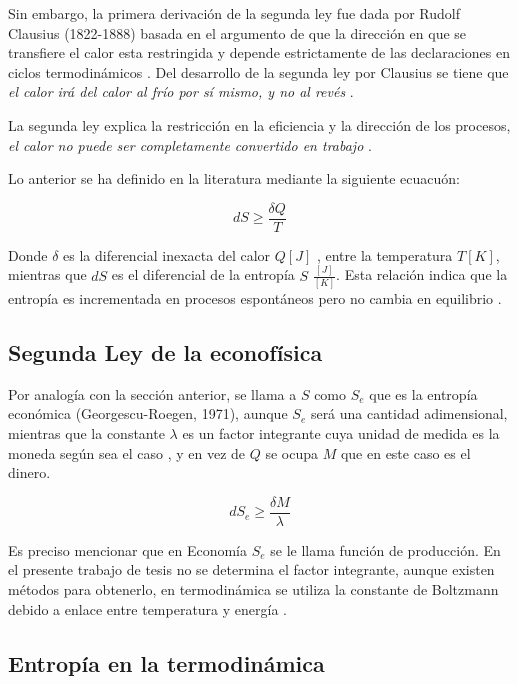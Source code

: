 Sin embargo, la primera derivación de la segunda ley fue dada por Rudolf Clausius (1822-1888) basada en el argumento de que la dirección en que se transfiere el calor esta restringida y depende estrictamente de las declaraciones en ciclos termodinámicos \citep[][pagina 55]{struchtrup}.  Del desarrollo de la segunda ley por Clausius se tiene que \textit{el calor irá del calor al frío por sí mismo, y no al revés} \citep[][pagina 64]{struchtrup}.

La segunda ley explica la restricción en la eficiencia y la dirección de los procesos, \textit{el calor no puede ser completamente convertido en trabajo} \citep[][pagina 5]{struchtrup}. 

Lo anterior se ha definido en la literatura mediante la siguiente ecuacuón:

\begin{equation}
dS \geqslant \frac{\delta Q}{T}
\end{equation}

Donde $\delta$ es la diferencial inexacta del calor $Q [J]$ , entre la temperatura $T [K]$, mientras que $dS$ es el diferencial de la entropía $S$ $\frac{[J]}{[K]}$. Esta relación indica que la entropía es incrementada en procesos espontáneos pero no cambia en equilibrio \citep[][pagina 340]{keszei2011chemical}. 

\subsection{Segunda Ley de la econofísica} 

Por analogía con la sección anterior, se llama a $S$ como $S_e$ que es la entropía económica (Georgescu-Roegen, 1971), aunque $S_e$ será una cantidad adimensional, mientras que la constante $\lambda$ es un factor integrante cuya unidad de medida es la moneda según sea el caso \citep[][pagina 166]{richmond} , y en vez de $Q$ se ocupa $M$ que en este caso es el dinero. 

\begin{equation}
dS_e \geqslant \frac{\delta M}{\lambda}
\end{equation}

Es preciso mencionar que en Economía $S_e$ se le llama función de producción. En el presente trabajo de tesis no se determina el factor integrante, aunque existen métodos para obtenerlo, en termodinámica se utiliza la constante de Boltzmann debido a enlace entre temperatura y energía \citep[][pagina 166]{richmond}. 

\subsection{Entropía en la termodinámica} 


